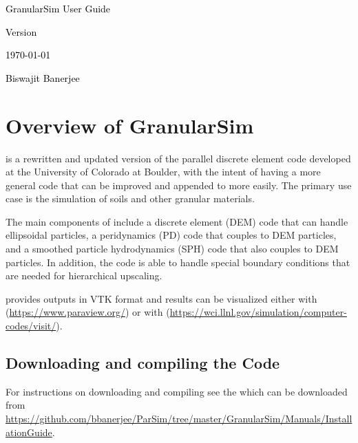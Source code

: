 \documentclass[11pt,fleqn]{book} %
\begin{document}
  \begingroup
    \thispagestyle{empty}
    \AddToShipoutPicture*{\BackgroundPic} %
    \centering
    \vspace*{1cm}
    \par\normalfont\fontsize{35}{35}\sffamily\selectfont
    \textcolor{black}{GranularSim User Guide}\par %
    \vspace*{0.5cm}
    {\Large \textcolor{black}{Version \version}}\par
    {\Large \textcolor{black}{\today}}\par
    \vspace*{13cm}
    {\Large \textcolor{black}{Biswajit Banerjee}}\par %
  \endgroup

  

\chapter{Overview of GranularSim} \label{sec:overview} 
\GranularSim is a rewritten and updated version of the parallel discrete element code \ParaEllip
developed at the University of Colorado at Boulder, with the intent of having a more general
code that can be improved and appended to more easily.  The primary use case is the simulation
of soils and other granular materials.

The main components of \GranularSim include a discrete element (DEM) code that can handle
ellipsoidal particles, a peridynamics (PD) code that couples to DEM particles, and
a smoothed particle hydrodynamics (SPH) code that also couples to DEM particles.
In addition, the code is able to handle special boundary conditions that are needed
for hierarchical upscaling.

\GranularSim provides outputs in VTK format and results can be visualized either
with \ParaView (\url{https://www.paraview.org/})
or with \Visit (\url{https://wci.llnl.gov/simulation/computer-codes/visit/}).

\section{Downloading and compiling the Code}
For instructions on downloading and compiling \GranularSim see the 
which can be downloaded from 
\url{https://github.com/bbanerjee/ParSim/tree/master/GranularSim/Manuals/InstallationGuide}.
\end{document}
